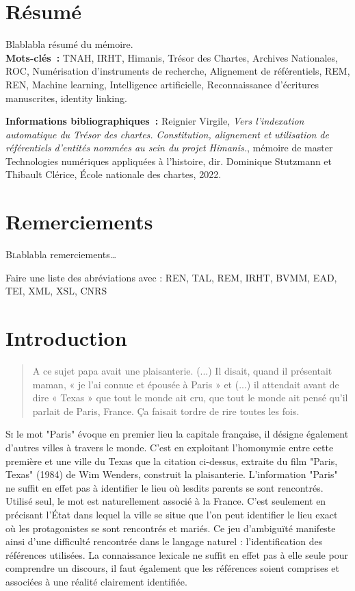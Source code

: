\documentclass[a4paper,12pt,twoside]{book}
\begin{document}
	\chapter{Résumé}
	\medskip
	Blablabla résumé du mémoire.\\
	
	\textbf{Mots-clés~:} TNAH, IRHT, Himanis, Trésor des Chartes, Archives Nationales, ROC, Numérisation d'instruments de recherche, Alignement de référentiels, REM, REN, Machine learning, Intelligence artificielle, Reconnaissance d'écritures manuscrites, identity linking.
	
	\textbf{Informations bibliographiques~:} Reignier Virgile, \textit{Vers l’indexation automatique du Trésor des chartes. Constitution, alignement et utilisation de référentiels d’entités nommées au sein du projet Himanis.}, mémoire de master \og{}Technologies numériques appliquées à l'histoire\fg{}, dir. Dominique Stutzmann et Thibault Clérice, École nationale des chartes, 2022.
	
	\chapter{Remerciements}
	
	\lettrine{B}lablabla remerciements\dots
	
		Faire une liste des abréviations avec : REN, TAL, REM, IRHT, BVMM, EAD, TEI, XML, XSL, CNRS
	
	\printbibliography
	
	\chapter{Introduction}
	
	\begin{quotation}
		
	A ce sujet papa avait une plaisanterie. (...) Il disait, quand il présentait maman, « je l’ai connue et épousée à Paris » et (...) il attendait avant de dire « Texas » que tout le monde ait cru, que tout le monde ait pensé qu’il parlait de Paris, France. Ça faisait tordre de rire toutes les fois.
	
	\end{quotation}
	\bigbreak
	
	
	\lettrine{S}{i} le mot "Paris" évoque en premier lieu la capitale française, il désigne également d'autres villes à travers le monde. C'est en exploitant l'homonymie entre cette première et une ville du Texas que la citation ci-dessus, extraite du film "Paris, Texas" (1984) de Wim Wenders, construit la plaisanterie. L'information "Paris" ne suffit en effet pas à identifier le lieu où lesdits parents se sont rencontrés. Utilisé seul, le mot est naturellement associé à la France. C'est seulement en précisant l'État dans lequel la ville se situe que l'on peut identifier le lieu exact où les protagonistes se sont rencontrés et mariés. Ce jeu d'ambiguïté manifeste ainsi d'une difficulté rencontrée dans le langage naturel : l'identification des références utilisées. La connaissance lexicale ne suffit en effet pas à elle seule pour comprendre un discours, il faut également que les références soient comprises et associées à une réalité clairement identifiée.
	
\end{document}
